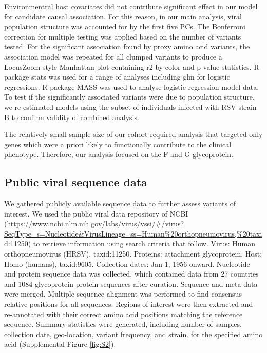 \documentclass[9pt,lineno]{elife}  %
\begin{document}
Environmentral host covariates did not contribute significant effect in our model for candidate causal association. 
For this reason, in our main analysis, viral population structure was accounted for by the first five PCs. 
The Bonferroni correction for multiple testing was applied based on the number of variants tested. For the significant association found by proxy amino acid variants, the association model was repeated for all clumped variants to produce a LocusZoom-style Manhattan plot containing r2 by color and p value statistics. 
R package stats was used for a range of analyses including glm for logistic regressions. 
R package MASS was used to analyse logistic regression model data. 
To test if the significantly associated variants were due to population structure, we re-estimated models using the subset of individuals infected with RSV strain B to confirm validity of combined analysis.

The relatively small sample size of our cohort required analysis that targeted only genes which were a priori likely to functionally contribute to the clinical phenotype. 
Therefore, our analysis focused on the F and G glycoprotein.

\subsection{Public viral sequence data}
We gathered publicly available sequence data to further assess variants of interest. We used the public viral data repository of NCBI 
(\url{https://www.ncbi.nlm.nih.gov/labs/virus/vssi/#/virus?SeqType_s=Nucleotide&VirusLineage_ss=Human\%20orthopneumovirus,\%20taxid:11250})
to retrieve information using search criteria that follow. Virus: Human orthopneumovirus (HRSV), taxid:11250. 
Proteins: attachment glycoprotein. Host: Homo (humans), taxid:9605. 
Collection dates: Jan 1, 1956 onward. 
Nucleotide and protein sequence data was collected, which contained data from 27 countries and 1084 glycoprotein protein sequences after curation. 
Sequence and meta data were merged. 
Multiple sequence alignment was performed to find consensus relative positions for all sequences. 
Regions of interest were then extracted and re-annotated with their correct amino acid positions matching the reference sequence. Summary statistics were generated, including number of samples, collection date, geo-location, variant frequency, and strain. for the specified amino acid 
(Supplemental Figure \ref{fig:S2}).
\end{document}
